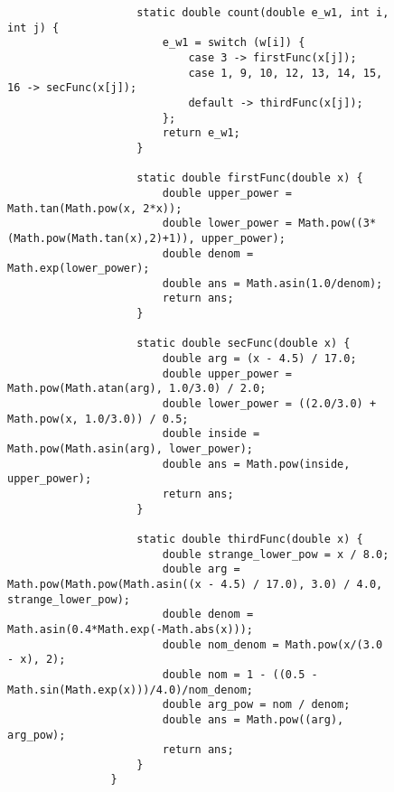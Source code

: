 \documentclass[12pt]{article}
\begin{document}
	\begin{figure}[H]
		\setlength{\fboxsep}{0pt}
		\setlength{\fboxrule}{0pt}
		\begin{center}
			\begin{lstlisting}
					static double count(double e_w1, int i, int j) {
						e_w1 = switch (w[i]) {
							case 3 -> firstFunc(x[j]);
							case 1, 9, 10, 12, 13, 14, 15, 16 -> secFunc(x[j]);
							default -> thirdFunc(x[j]);
						};
						return e_w1;
					}
					
					static double firstFunc(double x) {
						double upper_power = Math.tan(Math.pow(x, 2*x));
						double lower_power = Math.pow((3*(Math.pow(Math.tan(x),2)+1)), upper_power);
						double denom = Math.exp(lower_power);
						double ans = Math.asin(1.0/denom);
						return ans;
					}
					
					static double secFunc(double x) {
						double arg = (x - 4.5) / 17.0;
						double upper_power = Math.pow(Math.atan(arg), 1.0/3.0) / 2.0;
						double lower_power = ((2.0/3.0) + Math.pow(x, 1.0/3.0)) / 0.5;
						double inside = Math.pow(Math.asin(arg), lower_power);
						double ans = Math.pow(inside, upper_power);
						return ans;
					} 
					
					static double thirdFunc(double x) {
						double strange_lower_pow = x / 8.0;
						double arg = Math.pow(Math.pow(Math.asin((x - 4.5) / 17.0), 3.0) / 4.0, strange_lower_pow);
						double denom = Math.asin(0.4*Math.exp(-Math.abs(x)));
						double nom_denom = Math.pow(x/(3.0 - x), 2);
						double nom = 1 - ((0.5 - Math.sin(Math.exp(x)))/4.0)/nom_denom;
						double arg_pow = nom / denom;
						double ans = Math.pow((arg), arg_pow);
						return ans;
					} 
				}
			\end{lstlisting}
		\end{center}
	\end{figure}
\end{document}
